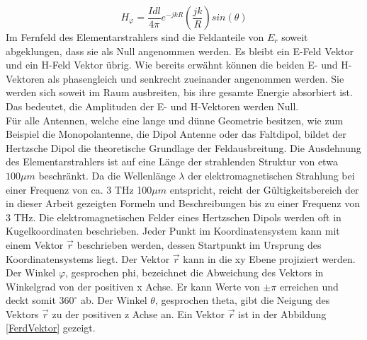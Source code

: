 \begin{equation}
H_\varphi= \frac{I dl}{4\pi}   e^{-jkR} \left( \frac{jk}{R} \right) sin(\theta)
\end{equation}
Im Fernfeld des Elementarstrahlers sind die Feldanteile von $E_r$ soweit abgeklungen, dass sie als Null angenommen werden. Es bleibt ein E-Feld Vektor und ein H-Feld Vektor übrig. Wie bereits erwähnt können die beiden E- und H-Vektoren als phasengleich und senkrecht zueinander angenommen werden. Sie werden sich soweit im Raum ausbreiten, bis ihre gesamte Energie absorbiert ist. Das bedeutet, die Amplituden der E- und H-Vektoren werden Null.\\


Für alle Antennen, welche eine lange und dünne Geometrie besitzen, wie zum Beispiel die Monopolantenne, die Dipol Antenne oder das Faltdipol, bildet der Hertzsche Dipol die theoretische Grundlage der Feldausbreitung. Die Ausdehnung des Elementarstrahlers ist auf eine Länge der strahlenden Struktur von etwa $100\mu m$ beschränkt. Da die Wellenlänge $\lambda$ der elektromagnetischen Strahlung bei einer Frequenz von ca. 3 THz 100$\mu m$ entspricht, reicht der Gültigkeitsbereich der in dieser Arbeit gezeigten Formeln und Beschreibungen bis zu einer Frequenz von 3 THz.
Die elektromagnetischen Felder eines Hertzschen Dipols werden oft in Kugelkoordinaten beschrieben. Jeder Punkt im Koordinatensystem kann mit einem Vektor $\vec{r}$ beschrieben werden, dessen Startpunkt im Ursprung des Koordinatensystems liegt. Der Vektor $\vec{r}$ kann in die xy Ebene projiziert werden. Der Winkel $\varphi$, gesprochen phi, bezeichnet die Abweichung des Vektors in Winkelgrad von der positiven x Achse. Er kann Werte von $\pm \pi$ erreichen und deckt somit $360^\circ$ ab. Der Winkel $\theta$, gesprochen theta, gibt die Neigung  des Vektors $\vec{r}$ zu der positiven z Achse an. Ein Vektor $\vec{r}$ ist in der Abbildung \ref{FerdVektor} gezeigt.




